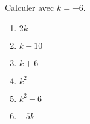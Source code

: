 
\begin{exercice}\label{exosmath-0979}

    Calculer avec \( k=-6\).
    \begin{multicols}{3}
    \begin{enumerate}
        \item
            \( 2k\)
        \item
            \( k-10\)
        \item
            \( k+6\)
        \item
            \( k^2\)
        \item
            \( k^2-6\)
        \item
            \( -5k\)
    \end{enumerate}
    \end{multicols}

\end{exercice}
